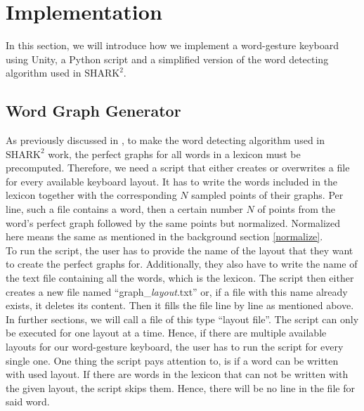 \chapter{Implementation}

In this section, we will introduce how we implement a word-gesture keyboard using Unity, a Python script and a simplified version of the word detecting algorithm used in $\text{SHARK}^2$.

\section{Word Graph Generator}
As previously discussed in , to make the word detecting algorithm used in $\text{SHARK}^2$ work, the perfect graphs for all words in a lexicon must be precomputed. Therefore, we need a script that either creates or overwrites a file for every available keyboard layout. It has to write the words included in the lexicon together with the corresponding $N$ sampled points of their graphs. Per line, such a file contains a word, then a certain number $N$ of points from the word's perfect graph followed by the same points but normalized. Normalized here means the same as mentioned in the background section \ref{normalize}.\\
To run the script, the user has to provide the name of the layout that they want to create the perfect graphs for. Additionally, they also have to write the name of the text file containing all the words, which is the lexicon. The script then either creates a new file named ``graph\_\textit{layout}.txt'' or, if a file with this name already exists, it deletes its content. Then it fills the file line by line as mentioned above. In further sections, we will call a file of this type ``layout file''. The script can only be executed for one layout at a time. Hence, if there are multiple available layouts for our word-gesture keyboard, the user has to run the script for every single one. One thing the script pays attention to, is if a word can be written with used layout. If there are words in the lexicon that can not be written with the given layout, the script skips them. Hence, there will be no line in the file for said word. 

